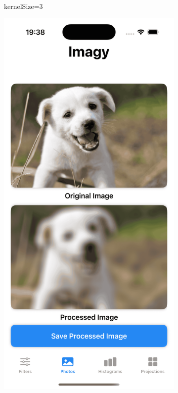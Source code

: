 \documentclass[a4paper]{article}
\begin{document}
\begin{itemize}
\begin{figure}[H]
\begin{subfigure}{0.2\textwidth}
                  \caption{kernelSize=3}
                  \label{fig:dog_averaging_3}
              \end{subfigure}
              \hfill
              \begin{subfigure}{0.2\textwidth}
                  \centering
                  \includegraphics[width=\linewidth]{images/dog_averaging_21.png}

\end{subfigure}
\end{figure}
\end{itemize}
\end{document}
